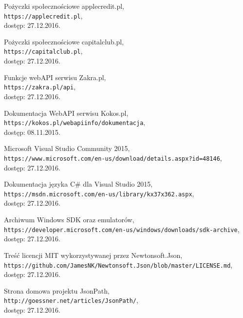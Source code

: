 \documentclass[a4paper,twoside,titlepage,openright]{book}
\begin{document}
\begin{thebibliography}{99}
 Pożyczki społecznościowe applecredit.pl, \\
\texttt{https://applecredit.pl}, \\dostęp: 27.12.2016.

 Pożyczki społecznościowe capitalclub.pl, \\
\texttt{https://capitalclub.pl}, \\dostęp: 27.12.2016.

 Funkcje webAPI serwisu Zakra.pl, \\
\texttt{https://zakra.pl/api}, \\dostęp: 27.12.2016.

 Dokumentacja WebAPI serwisu Kokos.pl, \\
\texttt{https://kokos.pl/webapiinfo/dokumentacja}, \\dostęp: 08.11.2015.

 Microsoft Visual Studio Community 2015, \\
\texttt{https://www.microsoft.com/en-us/download/details.aspx?id=48146}, \\dostęp: 27.12.2016.

 Dokumentacja języka C\# dla Visual Studio 2015, \\
\texttt{https://msdn.microsoft.com/en-us/library/kx37x362.aspx}, \\dostęp: 27.12.2016.


 Archiwum Windows SDK oraz emulatorów, \\
\texttt{https://developer.microsoft.com/en-us/windows/downloads/sdk-archive}, \\dostęp: 27.12.2016.

 Treść licencji MIT wykorzystywanej przez Newtonsoft.Json, \\
\texttt{https://github.com/JamesNK/Newtonsoft.Json/blob/master/LICENSE.md}, \\dostęp: 27.12.2016.

 Strona domowa projektu JsonPath, \\
\texttt{http://goessner.net/articles/JsonPath/}, \\dostęp: 27.12.2016.


\end{thebibliography}
\end{document}
